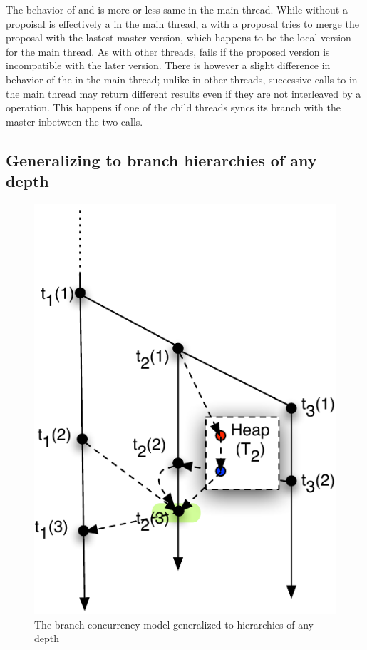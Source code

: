 The behavior of  and 
is more-or-less same in the main thread. While  without a
propoisal is effectively a  in the main thread, a  with
a proposal tries to merge the proposal with the lastest master
version, which happens to be the local version for the main thread. As
with other threads,  fails if the proposed version is
incompatible with the later version. There is however a slight
difference in behavior of the  in the main
thread; unlike in other threads, successive calls to
 in the main thread may return different
results even if they are not interleaved by a  operation. This
happens if one of the child threads syncs its branch with the master
inbetween the two calls.

\subsection{Generalizing to branch hierarchies of any depth}

\begin{figure}[t]
\centering
\includegraphics[scale=0.75]{Figures/sync-2}

\caption{The branch concurrency model generalized to hierarchies of
any depth}
\label{fig:sync-2}
\end{figure}

